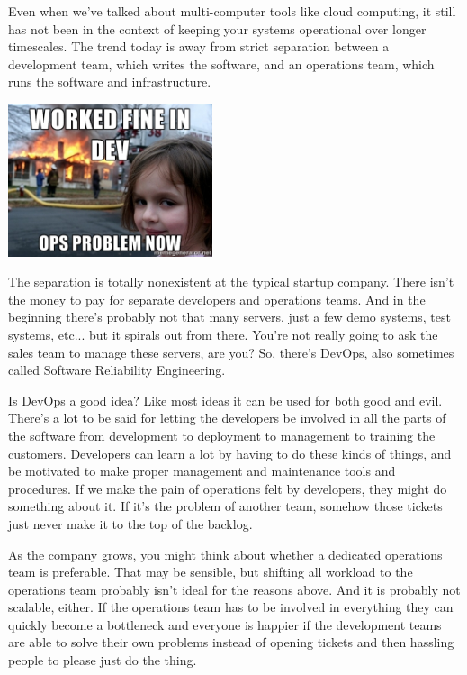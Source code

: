 \documentclass[a4paper]{report}
\begin{document}
Even when we've talked about multi-computer tools like cloud
computing, it still has not been in the context of keeping your
systems operational over longer timescales. The trend today is away
from strict separation between a development team, which writes the
software, and an operations team, which runs the software and infrastructure.

\begin{center}
	\includegraphics[width=0.45\textwidth]{images/devops.jpg}
\end{center}

The separation is totally nonexistent at the typical startup company. There isn't the money to pay for separate developers and operations teams. And in the beginning there's probably not that many servers, just a few demo systems, test systems, etc... but it spirals out from there. You're not really going to ask the sales team to manage these servers, are you? So, there's DevOps, also sometimes called Software Reliability Engineering.

Is DevOps a good idea? Like most ideas it can be used for both good and evil. There's a lot to be said for letting the developers be involved in all the parts of the software from development to deployment to management to training the customers. Developers can learn a lot by having to do these kinds of things, and be motivated to make proper management and maintenance tools and procedures. If we make the pain of operations felt by developers, they might do something about it. If it's the problem of another team, somehow those tickets just never make it to the top of the backlog.

As the company grows, you might think about whether a dedicated operations team is preferable. That may be sensible, but shifting all workload to the operations team probably isn't ideal for the reasons above. And it is probably not scalable, either. If the operations team has to be involved in everything they can quickly become a bottleneck and everyone is happier if the development teams are able to solve their own problems instead of opening tickets and then hassling people to please just do the thing.
\end{document}
